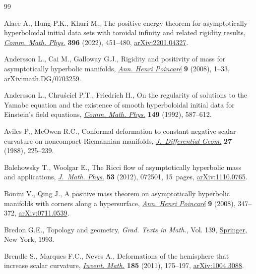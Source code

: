 \begin{thebibliography}{99}
\footnotesize\itemsep=-0.5pt

Alaee A., Hung P.K., Khuri M., The positive energy theorem for asymptotically
  hyperboloidal initial data sets with toroidal infinity and related rigidity
  results, \href{https://doi.org/10.1007/s00220-022-04467-x}{\textit{Comm. Math. Phys.}} \textbf{396} (2022), 451--480,
  \href{https://arxiv.org/abs/2201.04327}{arXiv:2201.04327}.

Andersson L., Cai M., Galloway G.J., Rigidity and positivity of mass for
  asymptotically hyperbolic manifolds, \href{https://doi.org/10.1007/s00023-007-0348-2}{\textit{Ann. Henri Poincar\'e}}
  \textbf{9} (2008), 1--33, \href{https://arxiv.org/abs/math.DG/0703259}{arXiv:math.DG/0703259}.

Andersson L., Chru\'sciel P.T., Friedrich H., On the regularity of solutions to
  the {Y}amabe equation and the existence of smooth hyperboloidal initial data
  for {E}instein's field equations, \href{https://doi.org/10.1007/BF02096944}{\textit{Comm. Math. Phys.}} \textbf{149}
  (1992), 587--612.

Aviles P., McOwen R.C., Conformal deformation to constant negative scalar
  curvature on noncompact {R}iemannian manifolds, \href{https://doi.org/10.4310/jdg/1214441781}{\textit{J.~Differential
  Geom.}} \textbf{27} (1988), 225--239.

Balehowsky T., Woolgar E., The {R}icci flow of asymptotically hyperbolic mass
  and applications, \href{https://doi.org/10.1063/1.4732118}{\textit{J.~Math. Phys.}} \textbf{53} (2012), 072501,
  15~pages, \href{https://arxiv.org/abs/1110.0765}{arXiv:1110.0765}.

Bonini V., Qing J., A positive mass theorem on asymptotically hyperbolic
  manifolds with corners along a hypersurface, \href{https://doi.org/10.1007/s00023-008-0358-8}{\textit{Ann. Henri Poincar\'e}}
  \textbf{9} (2008), 347--372, \href{https://arxiv.org/abs/0711.0539}{arXiv:0711.0539}.

Bredon G.E., Topology and geometry, \textit{Grad. Texts in Math.}, Vol. 139,
  \href{https://doi.org/10.1007/978-1-4757-6848-0}{Springer}, New York, 1993.

Brendle S., Marques F.C., Neves A., Deformations of the hemisphere that
  increase scalar curvature, \href{https://doi.org/10.1007/s00222-010-0305-4}{\textit{Invent. Math.}} \textbf{185} (2011),
  175--197, \href{https://arxiv.org/abs/1004.3088}{arXiv:1004.3088}.


\end{thebibliography}
